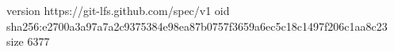 version https://git-lfs.github.com/spec/v1
oid sha256:e2700a3a97a7a2c9375384e98ea87b0757f3659a6ec5c18c1497f206c1aa8c23
size 6377
